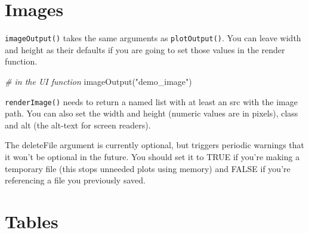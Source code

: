 \documentclass[
  oneside]{book}
\newenvironment{Shaded}{\begin{snugshade}}{\end{snugshade}}
\newcommand{\AttributeTok}[1]{\textcolor[rgb]{0.77,0.63,0.00}{#1}}
\newcommand{\CommentTok}[1]{\textcolor[rgb]{0.56,0.35,0.01}{\textit{#1}}}
\newcommand{\ConstantTok}[1]{\textcolor[rgb]{0.00,0.00,0.00}{#1}}
\newcommand{\DecValTok}[1]{\textcolor[rgb]{0.00,0.00,0.81}{#1}}
\newcommand{\FunctionTok}[1]{\textcolor[rgb]{0.00,0.00,0.00}{#1}}
\newcommand{\NormalTok}[1]{#1}
\newcommand{\OtherTok}[1]{\textcolor[rgb]{0.56,0.35,0.01}{#1}}
\newcommand{\SpecialCharTok}[1]{\textcolor[rgb]{0.00,0.00,0.00}{#1}}
\newcommand{\StringTok}[1]{\textcolor[rgb]{0.31,0.60,0.02}{#1}}
\begin{document}
\hypertarget{images}{%
\section{Images}\label{images}}

\texttt{imageOutput}\texttt{()} takes the same arguments as \texttt{plotOutput}\texttt{()}. You can leave \AttributeTok{width} and \AttributeTok{height} as their defaults if you are going to set those values in the render function.

\begin{Shaded}
\begin{Highlighting}[]
\CommentTok{\# in the UI function}
\FunctionTok{imageOutput}\NormalTok{(}\StringTok{"demo\_image"}\NormalTok{)}
\end{Highlighting}
\end{Shaded}

\texttt{renderImage}\texttt{()} needs to return a named list with at least an \AttributeTok{src} with the image path. You can also set the \AttributeTok{width} and \AttributeTok{height} (numeric values are in pixels), \AttributeTok{class} and \AttributeTok{alt} (the alt-text for screen readers).

\begin{Shaded}
\end{Shaded}

\begin{warning}
The \AttributeTok{deleteFile} argument is currently optional, but triggers periodic warnings that it won't be optional in the future. You should set it to \ConstantTok{TRUE} if you're making a temporary file (this stops unneeded plots using memory) and \ConstantTok{FALSE} if you're referencing a file you previously saved.

\end{warning}

\hypertarget{tables}{%
\section{Tables}\label{tables}}
\end{document}
